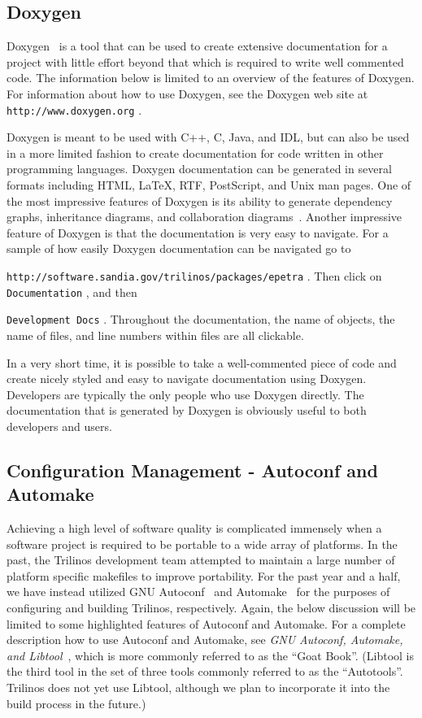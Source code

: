 \documentclass[12pt,relax]{article}
\newcommand{\InlineDirectory}[1]{
  {\hspace{0.01 in}} {\tt #1} {\hspace{0.01 in}}}
\begin{document}
\subsection{Doxygen}

Doxygen~\cite{Doxygen} is a tool that can be used to create 
extensive documentation for a project with little effort beyond that which is 
required to write well commented code.  The information below is limited 
to an overview of the features of Doxygen.  For information about how to use 
Doxygen, see the Doxygen 
web site at \InlineDirectory{http://www.doxygen.org}.  

Doxygen is meant to be used with C++, C, Java, and IDL, but can also be used 
in a more limited fashion to create documentation for code written in other
programming languages.  Doxygen documentation 
can be generated in several formats including HTML, LaTeX, RTF, PostScript, and
Unix man pages.  One of the most impressive features of Doxygen is its ability 
to generate dependency graphs, inheritance diagrams, and collaboration 
diagrams~\cite{Doxygen}.  Another impressive feature of Doxygen is that the 
documentation is very easy to navigate.  For a sample of how easily Doxygen 
documentation can be navigated go to
\newline
\InlineDirectory{http://software.sandia.gov/trilinos/packages/epetra}.  Then
click on \InlineDirectory{Documentation}, and then 
\InlineDirectory{Development Docs}. 
Throughout the documentation, the name of objects, 
the name of files, and line numbers within files are all clickable.

In a very short time, it is possible to take a well-commented piece of code 
and create nicely styled and easy to navigate documentation using Doxygen.
Developers are typically the only people who use Doxygen directly.  The 
documentation that is generated by Doxygen is obviously useful to both 
developers and users.

\subsection{Configuration Management - Autoconf and Automake}

Achieving a high level of software quality is complicated immensely when 
a software project is required to be portable to a wide array of platforms.
In the past, the Trilinos development team attempted to maintain a large 
number of platform specific makefiles to improve portability.  For the past 
year and a half, we have instead utilized GNU Autoconf~\cite{Autoconf} and 
Automake~\cite{Automake} for 
the purposes of configuring and building Trilinos, respectively.  Again, 
the below discussion will be limited to some highlighted features of Autoconf 
and Automake.  
For a complete description how to use Autoconf and Automake, see 
{\it GNU Autoconf, Automake, and Libtool}~\cite{GoatBook}, which is 
more commonly referred to as the ``Goat Book''.  (Libtool is the third tool 
in the set of three tools commonly referred to as the ``Autotools''.  Trilinos 
does not yet use Libtool, although we plan to incorporate it into the build 
process in the future.)
\end{document}
